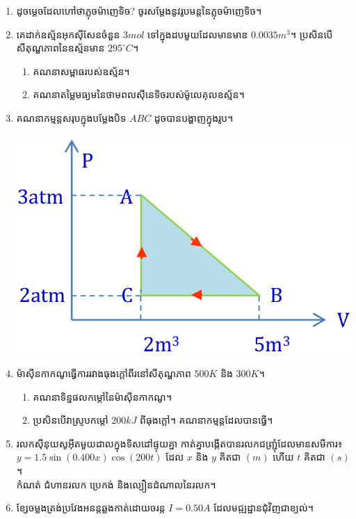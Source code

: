 \documentclass{officialexam}
\begin{document}
\begin{enumerate}[I]
	\item ដូចម្តេចដែលហៅថាភ្លុចម៉ាញេទិច? ចូរសម្តែងនូវរូបមន្តនៃភ្លុចម៉ាញេទិច។
	\item គេដាក់ឧស្ម័នអុកសុីសែនចំនួន $3mol$ ទៅក្នុងដបមួយដែលមានមាឌ $0.0035m^3$។ ប្រសិនបើសីតុណ្ហភាពនៃឧស្ម័នមាន $295^\circ C$។
	\begin{enumerate}[k]
		\item គណនាសម្ពាធរបស់ឧស្ម័ន។
		\item គណនាតម្លៃមធ្យមនៃថាមពលសុីនេទិចរបស់ម៉ូលេគុលឧស្ម័ន។
	\end{enumerate}
	\item គណនាកម្មន្តសរុបក្នុងបម្លែងបិទ $ABC$ ដូចបានបង្ហាញក្នុងរូប។
	\begin{center}
		\includegraphics[scale=0.3]{image4}
	\end{center}
	\item ម៉ាសុីនកាកណូធ្វើការរវាងធុងក្តៅពីរនៅសីតុណ្ហភាព $500K$ និង $300K$។
	\begin{enumerate}[k]
		\item គណនាទិន្នផលកម្តៅនៃម៉ាសុីនកាកណូ។
		\item ប្រសិនបើវាស្រូបកម្តៅ $200kJ$ ពីធុងក្តៅ។ គណនាកម្មន្តដែលបានធ្វើ។
	\end{enumerate}
	\item រលកសុីនុយសូអុីតមួយដាលក្នុងទិសដៅផ្ទុយគ្នា កាត់គ្នាបង្កើតបានរលកជញ្រ្ជុំដែលមានសមីការ៖ $y=1.5\sin\left(0.400x\right)\cos\left(200t\right)$ ដែល $x$ និង $y$ គិតជា $\left(m\right)$ ហើយ $t$ គិតជា $\left(s\right)$។\\
	កំណត់ ជំហានរលក ប្រេកង់ និងល្បឿនដំណាលនៃរលក។
	\item ខ្សែចម្លងត្រង់ប្រវែងអនន្តឆ្លងកាត់ដោយចរន្ត $I=0.50A$ ដែលមជ្ឍដ្ឋានជុំវិញជាខ្យល់។
	\begin{enumerate}[k]

\end{enumerate}
\end{enumerate}
\end{document}
